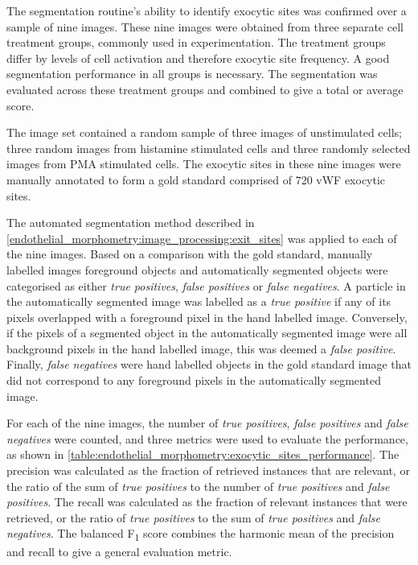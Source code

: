 The segmentation routine's ability to identify exocytic sites was confirmed over a sample of nine images. These nine images were obtained from three separate cell treatment groups, commonly used in experimentation. The treatment groups differ by levels of cell activation and therefore exocytic site frequency. A good segmentation performance in all groups is necessary. The segmentation was evaluated across these treatment groups and combined to give a total or average score.

The image set contained a random sample of three images of unstimulated cells; three random images from histamine stimulated cells and three randomly selected images from PMA stimulated cells. The exocytic sites in these nine images were manually annotated to form a gold standard comprised of 720 vWF exocytic sites.

The automated segmentation method described in \autoref{endothelial_morphometry:image_processing:exit_sites} was applied to each of the nine images. Based on a comparison with the gold standard, manually labelled images foreground objects and automatically segmented objects were categorised as either \emph{true positives}, \emph{false positives} or \emph{false negatives}. A particle in the automatically segmented image was labelled as a \emph{true positive} if any of its pixels overlapped with a foreground pixel in the hand labelled image. Conversely, if the pixels of a segmented object in the automatically segmented image were all background pixels in the hand labelled image, this was deemed a \emph{false positive}. Finally, \emph{false negatives} were hand labelled objects in the gold standard image that did not correspond to any foreground pixels in the automatically segmented image.

For each of the nine images, the number of \emph{true positives}, \emph{false positives} and \emph{false negatives} were counted, and three metrics were used to evaluate the performance, as shown in \autoref{table:endothelial_morphometry:exocytic_sites_performance}. The precision was calculated as the fraction of retrieved instances that are relevant, or the ratio of the sum of \emph{true positives} to the number of \emph{true positives} and \emph{false positives}. The recall was calculated as the fraction of relevant instances that were retrieved, or the ratio of \emph{true positives} to the sum of \emph{true positives} and \emph{false negatives}. The balanced F\textsubscript{1} score combines the harmonic mean of the precision and recall to give a general evaluation metric.

